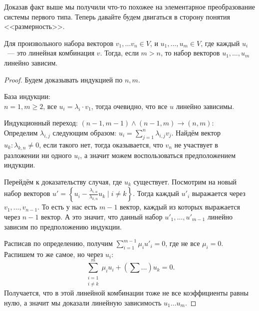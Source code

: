 \begin{motivation}
    Доказав факт выше мы получили что-то похожее на элементарное преобразование системы первого типа.
    Теперь давайте будем двигаться в сторону понятия <<размерность>>.
\end{motivation}
\begin{theorem}
    Для произвольного набора векторов
    $v_1,\dots v_n\in V$, и $u_1,\dots, u_m\in V$, где каждый $u_i$~--- это линейная комбинация $v$. 
    Тогда, если $m > n$, то набор векторов $u_1,\dots,u_m$ линейно зависим.
\end{theorem}
\begin{proof}
    Будем доказывать индукцией по $n,m$.

    База индукции:\\$n = 1, m \ge 2$, все $u_i = \lambda_i\cdot v_1$, тогда очевидно,
    что все $u$ линейно зависимы.

    Индукционный переход: $(n-1,m-1) \land (n-1,m)\rightarrow (n,m)$:\\
    Определим $\lambda_{i,j}$ следующим образом: $u_i = \sum\limits_{j=1}^{n} \lambda_{i,j} v_j$.
    Найдём вектор $u_k\colon \lambda_{k,n}\not=0$, если такого нет, тогда оказывается, что $v_n$ не
    участвует в разложении ни одного $u_i$, а значит можем воспользоваться предположением индукции.

    Перейдём к доказательству случая, где $u_k$ существует.
    Посмотрим на новый набор векторов $u' = \left\{u_i - \frac{\lambda_{i,n}}{\lambda_{k,n}}u_k \mid i\not=k\right\}$.
    Тогда каждый $u'_i$ выражается через $v_1,\dots,v_{n-1}$.
    То есть у нас есть $m-1$ вектор, каждый из которых выражается
    через $n-1$ вектор. А это значит, что данный набор $u'_1,\dots, u'_{m-1}$ линейно зависим по предположению индукции.

    Расписав по определению, получим $\sum\limits_{i=1}^{m-1}\mu_i u'_i = 0$, где не все $\mu_i=0$.
    Распишем то же самое, но через $u_i$: 
    \[
        \sum\limits_{\substack{i=1\\i\neq k}}^{m}\mu_iu_i + (\sum\limits\dots)u_k=0
    .\]
    Получается, что в этой линейной комбинации тоже не все коэффициенты равны нулю,
    а значит мы доказали линейную зависимость $u_1\dots u_m$. 
\end{proof}

